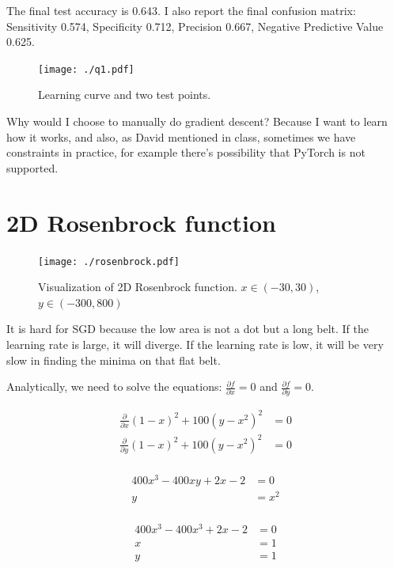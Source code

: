 The final test accuracy is 0.643.
I also report the final confusion matrix:
Sensitivity 0.574, Specificity 0.712,
Precision 0.667, Negative Predictive Value 0.625.

\begin{figure}[h]
    \centering
    \texttt{[image: ./q1.pdf]}
    \caption{Learning curve and two test points.}
\end{figure}

Why would I choose to manually do gradient descent?
Because I want to learn how it works, and also, as David mentioned in class, sometimes we have constraints in practice, for example there's possibility that PyTorch is not supported.

\newpage
\section{2D Rosenbrock function}
\begin{figure}[h]
    \texttt{[image: ./rosenbrock.pdf]}
    \caption{Visualization of 2D Rosenbrock function. $x \in (-30,30)$, $y \in (-300,800)$}
\end{figure}

It is hard for SGD because the low area is not a dot but a long belt.
If the learning rate is large, it will diverge.
If the learning rate is low, it will be very slow in finding the minima on that flat belt.

Analytically, we need to solve the equations: $\frac{\partial f}{\partial x} = 0$ and $\frac{\partial f}{\partial y} = 0$.

\begin{align*}[left = \empheqlbrace]
    \frac{\partial}{\partial x} (1-x)^2+100(y-x^2)^2 & = 0 \\
    \frac{\partial}{\partial y} (1-x)^2+100(y-x^2)^2 & = 0 \\
\end{align*}

\begin{align*}[left = \empheqlbrace]
    400x^3-400xy+2x-2 & = 0  \\
    y                 & =x^2 \\
\end{align*}

\begin{align*}
    400x^3-400x^3+2x-2 & = 0 \\
    x                  & =1  \\
    y                  & =1  \\
\end{align*}

